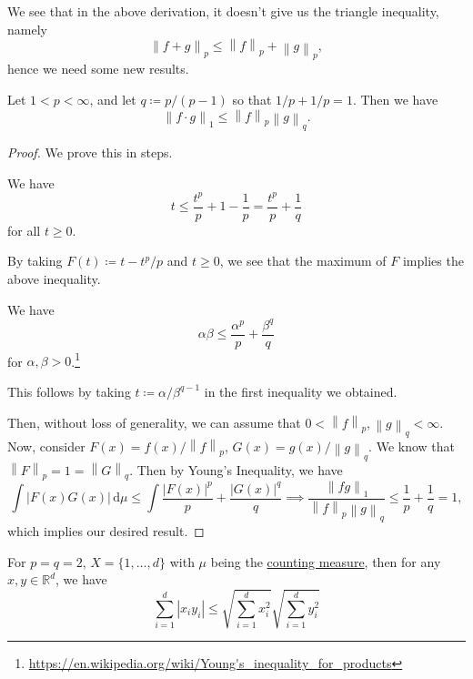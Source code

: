 We see that in the above derivation, it doesn't give us the triangle inequality, namely
\[
	\left\lVert f + g\right\rVert _p \leq  \left\lVert f\right\rVert _p + \left\lVert g\right\rVert _p,
\]
hence we need some new results.

\begin{theorem}\label{thm:Holder-inequality}
	Let \(1 < p < \infty \), and let \(q \coloneqq p / (p - 1)\) so that \(1 / p + 1 / p = 1\). Then we have
	\[
		\left\lVert f\cdot g\right\rVert _1 \leq  \left\lVert f\right\rVert _p \left\lVert g\right\rVert _q.
	\]
\end{theorem}
\begin{proof}
	We prove this in steps.
	\begin{claim}
		We have
		\[
			t\leq \frac{t^p}{p}+1-\frac{1}{p} = \frac{t^p}{p}+ \frac{1}{q}
		\]
		for all \(t \geq 0\).
	\end{claim}
	\begin{explanation}
		By taking \(F(t) \coloneqq t - t^p / p\) and \(t \geq 0\), we see that the maximum of \(F\) implies the above inequality.
	\end{explanation}
	\begin{claim}
		We have
		\[
			\alpha \beta \leq \frac{\alpha ^p}{p} + \frac{\beta ^q}{q}
		\]
		for \(\alpha , \beta > 0\).\footnote{\url{https://en.wikipedia.org/wiki/Young's_inequality_for_products}}
	\end{claim}
	\begin{explanation}
		This follows by taking \(t \coloneqq \alpha /\beta ^{q - 1}\) in the first inequality we obtained.
	\end{explanation}

	Then, without loss of generality, we can assume that \(0 <\left\lVert f\right\rVert _p, \left\lVert g\right\rVert _q < \infty \). Now, consider \(F(x) = f(x) / \left\lVert f\right\rVert _p\),
	\(G(x) = g(x) / \left\lVert g\right\rVert _q\). We know that \(\left\lVert F\right\rVert _p = 1 = \left\lVert G\right\rVert _q\). Then by Young's Inequality, we have
	\[
		\int \left\vert F(x)G(x) \right\vert \,\mathrm{d} \mu \leq \int \frac{\left\vert F(x) \right\vert ^p}{p} + \frac{\left\vert G(x) \right\vert ^q}{q} \implies \frac{\left\lVert fg\right\rVert _1}{\left\lVert f\right\rVert _p \left\lVert g\right\rVert _q}\leq \frac{1}{p} + \frac{1}{q} = 1,
	\]
	which implies our desired result.
\end{proof}
\begin{eg}
	For \(p = q = 2\), \(X = \{1, \dots , d \}\) with \(\mu \) being the \hyperref[eg:counting-measure]{counting measure}, then for any \(x, y\in \mathbb{R} ^d\), we have
	\[
		\sum\limits_{i=1}^{d} \left\vert x_{i} y_{i}  \right\vert \leq \sqrt{\sum\limits_{i=1}^{d} x_{i} ^{2} } \sqrt{\sum\limits_{i=1}^{d} y_{i} ^{2} }
	\]
\end{eg}

